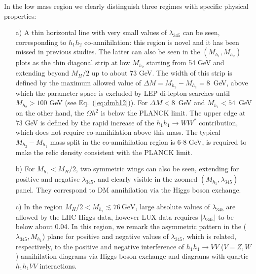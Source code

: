 \documentclass[12pt,a4paper]{article}
\begin{document}
In the low mass region we clearly distinguish three regimes with specific physical properties:
\begin{itemize}
\item[a)] A thin horizontal line with very small values of $\lambda_{345}$ can be seen, corresponding to  $h_1h_2$ co-annihilation: this region is novel and it has been missed in previous studies. 
The latter can also be seen in the $(M_{h_1},M_{h_2})$ plots as the thin diagonal strip at low $M_{h_2}$
starting from 54 GeV and extending beyond $M_H/2$ up to about 73 GeV.
%
%
The width of this strip is defined by 
the maximum allowed value of $\Delta M = M_{h_2}-M_{h_1}=8$~GeV, above which
the parameter space is excluded by LEP di-lepton searches until $M_{h_2} > 100$ GeV (see Eq.~(\ref{eq:dmh12})). For  $\Delta M<8$~GeV
and $M_{h_1}<54$~GeV on the other hand, the $\Omega h^2$ is below the PLANCK limit. The upper edge
at $73$ GeV is defined by the rapid increase of the  $h_1 h_1 \to W W^*$ contribution,
which does not require co-annihilation above this mass. The typical $M_{h_2}-M_{h_1}$
mass split in the co-annihilation region is 6-8 GeV, is required to make the relic density 
consistent with the PLANCK limit.

\item[b)] For $M_{h_1}< M_H/2$, two symmetric wings can also be seen, extending for positive and negative $\lambda_{345}$, and 
clearly visible in the zoomed $(M_{h_1},\lambda_{345})$ panel. They correspond to DM annihilation via the Higgs boson exchange. 

\item[c)] In the region $M_H/2<  M_{h_1} \lesssim 76~\mbox{GeV}$,  
large absolute values of  $\lambda_{345}$ are allowed by the LHC Higgs data, however LUX data requires $|\lambda_{345}|$ to be below about 0.04.
In this region, we remark the asymmetric pattern in the ($\lambda_{345},M_{h_1}$) plane
for positive and negative values of $\lambda_{345}$, which is related, respectively, to the 
positive and negative interference of  $h_1 h_1 \to VV$ ($V=Z,W$) annihilation diagrams via Higgs boson exchange
and diagrams with quartic $h_1 h_1 V V$  interactions. 
\end{itemize}
\end{document}
